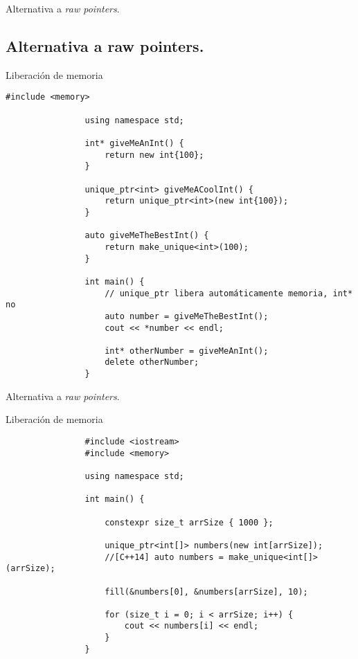 \documentclass{beamer}
\newcommand{\normalSizeItem}[1] {
  \normalsize{\item #1}
}
\begin{document}
		\begin{frame}[fragile]{Alternativa a \textit{raw pointers}. }	
			\subsection{Alternativa a raw pointers. }
			\begin{itemize}
			
				\normalSizeItem { Liberación de memoria }
				\begin{lstlisting}[basicstyle={\tiny\ttfamily}]
				#include <memory>
				
				using namespace std;
				
				int* giveMeAnInt() { 
					return new int{100};
				}
				
				unique_ptr<int> giveMeACoolInt() {
					return unique_ptr<int>(new int{100});
				}
				
				auto giveMeTheBestInt() {
					return make_unique<int>(100);
				}
				
				int main() {	
					// unique_ptr libera automáticamente memoria, int* no
					auto number = giveMeTheBestInt();
					cout << *number << endl;
					
					int* otherNumber = giveMeAnInt();
					delete otherNumber;
				}
				\end{lstlisting}				
			\end{itemize}
		\end{frame}
		
		\begin{frame}[fragile]{Alternativa a \textit{raw pointers}. }	
			\begin{itemize}
			
				\normalSizeItem { Liberación de memoria }
				\begin{lstlisting}
				#include <iostream>
				#include <memory>
				
				using namespace std;
				
				int main() {	
					
					constexpr size_t arrSize { 1000 };
					
					unique_ptr<int[]> numbers(new int[arrSize]);
					//[C++14] auto numbers = make_unique<int[]>(arrSize);
					
					fill(&numbers[0], &numbers[arrSize], 10);
					
					for (size_t i = 0; i < arrSize; i++) {
						cout << numbers[i] << endl;
					}
				}
				\end{lstlisting}				
			\end{itemize}
		\end{frame}
		
\end{document}
